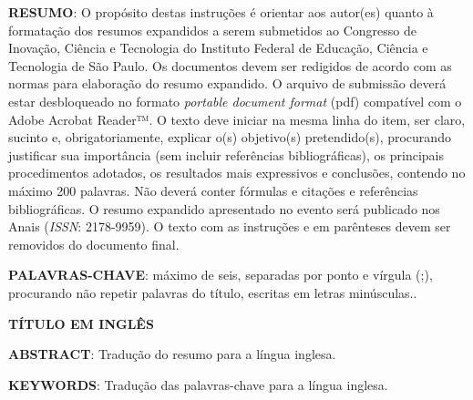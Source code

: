 \documentclass[a4paper,12pt]{article} %
\begin{document}






\vspace{0.5cm}
\noindent\textbf{RESUMO}: O propósito destas instruções é orientar aos autor(es) quanto à formatação dos resumos expandidos a serem submetidos ao Congresso de Inovação, Ciência e Tecnologia do Instituto Federal de Educação, Ciência e Tecnologia de São Paulo. Os documentos devem ser redigidos de acordo com as normas para elaboração do resumo expandido. O arquivo de submissão deverá estar desbloqueado no formato \textit{portable document format} (pdf) compatível com o Adobe Acrobat Reader™. O texto deve iniciar na mesma linha do item, ser claro, sucinto e, obrigatoriamente, explicar o(s) objetivo(s) pretendido(s), procurando justificar sua importância (sem incluir referências bibliográficas), os principais procedimentos adotados, os resultados mais expressivos e conclusões, contendo no máximo 200 palavras. Não deverá conter fórmulas e citações e referências bibliográficas. O resumo expandido apresentado no evento será publicado nos Anais (\textit{ISSN}: 2178-9959). O texto com as instruções e em parênteses devem ser removidos do documento final.

\vspace{0.5cm}
\noindent\textbf{PALAVRAS-CHAVE}: máximo de seis, separadas por ponto e vírgula (;), procurando não repetir palavras do título, escritas em letras minúsculas..

\vspace{0.5cm}
 \begin{center}
 \textbf{TÍTULO EM INGLÊS}
 \end{center}

\noindent\textbf{ABSTRACT}: Tradução do resumo para a língua inglesa.

\vspace{0.5cm}
\noindent\textbf{KEYWORDS}: Tradução das palavras-chave para a língua inglesa.








\end{document}
